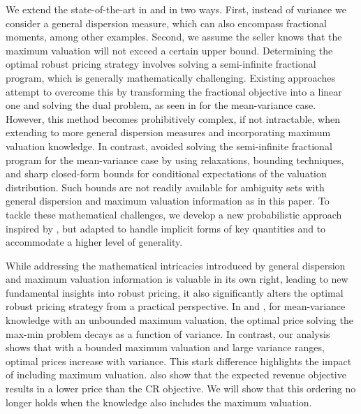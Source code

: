 \documentclass[11pt]{article}
\newcommand{\1}{\mathds{1}}
\begin{document}
We extend the state-of-the-art in \cite{giannakopoulos2019robust} and \cite{chen2022distribution} in two ways. First, instead of variance we consider a general dispersion measure, which can also encompass fractional moments, among other examples. Second, we assume the seller knows that the maximum valuation will not exceed a certain upper bound. Determining the optimal robust pricing strategy involves solving a semi-infinite fractional program, which is generally mathematically challenging. Existing approaches attempt to overcome this by transforming the fractional objective into a linear one and solving the dual problem, as seen in \cite{chen2022distribution} for the mean-variance case. However, this method becomes prohibitively complex, if not intractable, when extending to more general dispersion measures and incorporating maximum valuation knowledge. In contrast, \cite{giannakopoulos2019robust} avoided solving the semi-infinite fractional program for the mean-variance case by using relaxations, bounding techniques, and sharp closed-form bounds for conditional expectations of the valuation distribution. Such bounds are not readily available for ambiguity sets with general dispersion and maximum valuation information as in this paper.
To tackle these mathematical challenges, we develop a new probabilistic approach inspired by \cite{giannakopoulos2019robust}, but adapted to handle implicit forms of key quantities and to accommodate a higher level of generality. 

While addressing the mathematical intricacies introduced by general dispersion and maximum valuation information is valuable in its own right, leading to new fundamental insights into robust pricing, it also significantly alters the optimal robust pricing strategy from a practical perspective. In \cite{giannakopoulos2019robust} and \cite{chen2022distribution}, for mean-variance knowledge with an unbounded maximum valuation, the optimal price solving the max-min problem decays as a function of variance. In contrast, our analysis shows that with a bounded maximum valuation and large variance ranges, optimal prices increase with variance. This stark difference highlights the impact of including maximum valuation. %
\cite{chen2022distribution} also show that the expected revenue objective results in a lower price than the CR objective. We will show that this ordering no longer holds when the knowledge also includes the maximum valuation. 
\end{document}
